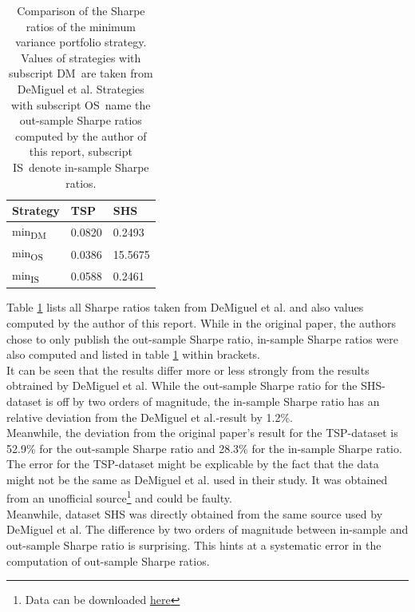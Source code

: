 \begin{table}[h]
  \begin{center}
    \begin{tabular}{|l|l|l|}
    \hline
    Strategy & TSP &  SHS\\ \hline
    min\textsubscript{DM}& 0.0820 & 0.2493\\ \hline
    min\textsubscript{OS} & 0.0386 & 15.5675 \\ \hline
    min\textsubscript{IS} & 0.0588 & 0.2461 \\ \hline
    \end{tabular}
  \end{center}
\caption{Comparison of the Sharpe ratios of the minimum variance portfolio strategy. Values of strategies with subscript \glqq DM\grqq~are taken from DeMiguel et al. Strategies with subscript \glqq OS\grqq~name the out-sample Sharpe ratios computed by the author of this report, subscript \glqq IS\grqq~denote in-sample Sharpe ratios.} 
\label{tab:comparison-sharpe-ratios}
\end{table}

Table \ref{tab:comparison-sharpe-ratios} lists all Sharpe ratios taken from DeMiguel et al. \cite{DEM09} and also values computed by the author of this report. While in the original paper, the authors chose to only publish the out-sample Sharpe ratio, in-sample Sharpe ratios were also computed and listed in table \ref{tab:comparison-sharpe-ratios} within brackets. \\

It can be seen that the results differ more or less strongly from the results obtrained by DeMiguel et al. While the out-sample Sharpe ratio for the SHS-dataset is off by two orders of magnitude, the in-sample Sharpe ratio has an relative deviation from the DeMiguel et al.-result by 1.2\%.\\

Meanwhile, the deviation from the original paper's result for the TSP-dataset is 52.9\% for the out-sample Sharpe ratio and 28.3\% for the in-sample Sharpe ratio. \\

The error for the TSP-dataset might be explicable by the fact that the data might not be the same as DeMiguel et al. used in their study. It was obtained from an unofficial source\footnote{Data can be downloaded \href{https://data.mendeley.com/datasets/ndxfrshm74/3}{here}} and could be faulty. \\

Meanwhile, dataset SHS was directly obtained from the same source used by DeMiguel et al. The difference by two orders of magnitude between in-sample and out-sample Sharpe ratio is surprising. This hints at a systematic error in the computation of out-sample Sharpe ratios.

